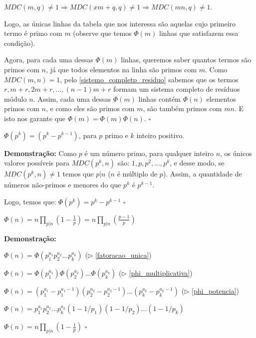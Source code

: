 $MDC(m,q) \neq 1 \Rightarrow MDC(xm+q,q) \neq 1 \Rightarrow MDC(mn,q) \neq 1$.
\newline

Logo, as únicas linhas da tabela que nos interessa são aquelas cujo primeiro termo é primo com $m$ (observe que temos $\Phi(m)$
linhas que satisfazem essa condição).

Agora, para cada uma dessas $\Phi(m)$ linhas, queremos saber quantos termos são primos com $n$, já que todos elementos na linha são
primos com $m$. Como $MDC(m,n) = 1$, pelo \autoref{sistemo_completp_residuo} sabemos que os termos $r,m+r,2m+r,...,(n-1)m+r$ formam um sistema completo de resíduos módulo $n$.
Assim, cada uma dessas $\Phi(m)$ linhas contém $\Phi(n)$ elementos primos com $n$, e como eles são primos com $m$, são também
primos com $mn$. E isto nos garante que $\Phi(m) = \Phi(m)\Phi(n)$. $\square$


\begin{theorem}\label{phi_potencia}
$\Phi(p^k) = (p^k - p^{k-1})$, para $p$ primo e $k$ inteiro positivo.
\end{theorem}
\textbf{Demonstração:}
Como $p$ é um número primo, para qualquer inteiro $n$, os únicos valores possíveis para $MDC(p^k,n)$ são: $1, p, p^2,...,p^k$, 
e desse modo, se $MDC(p^k,n)\neq1$ temos que $p|n$ ($n$ é múltiplo de $p$). Assim, a quantidade de números não-primos e menores do que $p^k$ é $p^{k-1}$.

Logo, temos que: $\Phi(p^k) = p^k - p^{k-1}$ $\square$




\begin{theorem}\label{formula_produto_euler}
$\Phi(n) = n \prod_{p|n}(1 - \frac{1}{p}) = n \prod_{p|n}(\frac{p-1}{p})$
\end{theorem}
\textbf{Demonstração:}

$\Phi(n) = \Phi(p_1^{a_1}p_2^{a_2}...p_k^{a_k})$ ($\triangleright$ \autoref{fatoracao_unica})

$\Phi(n) = \Phi(p_1^{a_1})\Phi(p_2^{a_2})...\Phi(p_k^{a_k})$ ($\triangleright$ \autoref{phi_multiplicativa})

$\Phi(n) = (p_1^{a_1} - p_1^{a_1-1})(p_2^{a_2} - p_2^{a_2-1})...(p_k^{a_k} - p_k^{a_k-1})$ ($\triangleright$ \autoref{phi_potencia})

$\Phi(n) = p_1^{a_1}p_2^{a_2}...p_k^{a_k}(1 - 1/p_1)(1 - 1/p_2)...(1 - 1/p_k)$

$\Phi(n) = n \prod_{p|n}(1 - \frac{1}{p})$ $\square$\\

